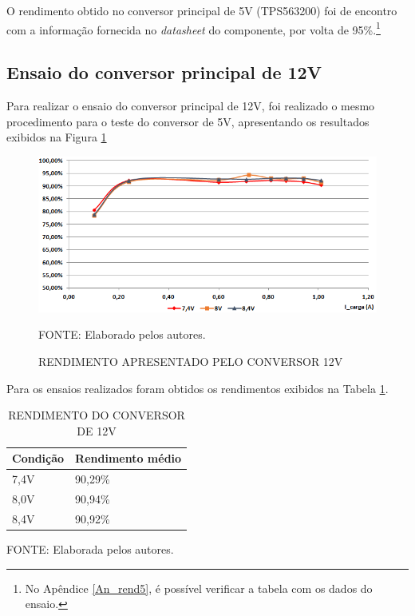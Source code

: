 \documentclass[
	12pt,				%
	openright,			%
	oneside,			%
	a4paper,			%
	english,			%
	french,				%
	spanish,			%
	brazil,				%
	oldfontcommands
	]{abntex2}
\begin{document}
	O rendimento obtido no conversor principal de 5V (TPS563200) foi de encontro com a informação fornecida no \textit{datasheet} do componente, por volta de 95\%.\footnote{No Apêndice \ref{An_rend5}, é possível verificar a tabela com os dados do ensaio.} 

\subsection[Ensaio do conversor principal de 12V]{Ensaio do conversor principal de 12V}

	Para realizar o ensaio do conversor principal de 12V, foi realizado o mesmo procedimento para o teste do conversor de 5V, apresentando os resultados exibidos na Figura \ref{Fig_rend12}
	
	\begin{figure}[th]
		\caption{RENDIMENTO APRESENTADO PELO CONVERSOR 12V}
		\label{Fig_rend12}
		\centering
		\includegraphics[width=0.9\linewidth]{./figs/rend12}
			
		\begin{small}
			FONTE: Elaborado pelos autores.
		\end{small}		
	\end{figure}	
	
	Para os ensaios realizados foram obtidos os rendimentos exibidos na Tabela \ref{Tab_rend12}.
	
	\begin{table}[th]
	\caption{RENDIMENTO DO CONVERSOR DE 12V}
	\label{Tab_rend12}
	\centering
		\begin{tabular}{p{2cm}|p{4cm}}
			\textbf{Condição} & \textbf{Rendimento médio}\\
			\hline
			7,4V & 90,29\%\\
			8,0V & 90,94\%\\
			8,4V & 90,92\%\\
		\end{tabular}	
	
	\begin{small}
	\vspace{3pt}
		FONTE: Elaborada pelos autores.
	\end{small}
	\end{table}
	
\end{document}
